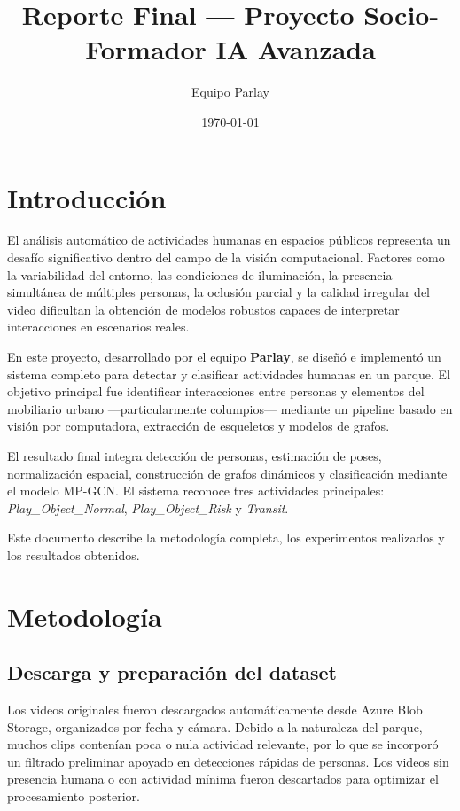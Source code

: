 \documentclass{article}
\title{Reporte Final — Proyecto Socio-Formador IA Avanzada}
\author{Equipo Parlay}
\date{\today}
\begin{document}
\maketitle

\section{Introducción}

El análisis automático de actividades humanas en espacios públicos representa un desafío significativo dentro del campo de la visión computacional. Factores como la variabilidad del entorno, las condiciones de iluminación, la presencia simultánea de múltiples personas, la oclusión parcial y la calidad irregular del video dificultan la obtención de modelos robustos capaces de interpretar interacciones en escenarios reales.

En este proyecto, desarrollado por el equipo \textbf{Parlay}, se diseñó e implementó un sistema completo para detectar y clasificar actividades humanas en un parque. El objetivo principal fue identificar interacciones entre personas y elementos del mobiliario urbano —particularmente columpios— mediante un pipeline basado en visión por computadora, extracción de esqueletos y modelos de grafos.

El resultado final integra detección de personas, estimación de poses, normalización espacial, construcción de grafos dinámicos y clasificación mediante el modelo MP-GCN. El sistema reconoce tres actividades principales: \emph{Play\_Object\_Normal}, \emph{Play\_Object\_Risk} y \emph{Transit}. 

Este documento describe la metodología completa, los experimentos realizados y los resultados obtenidos.

\section{Metodología}

\subsection{Descarga y preparación del dataset}

Los videos originales fueron descargados automáticamente desde Azure Blob Storage, organizados por fecha y cámara. Debido a la naturaleza del parque, muchos clips contenían poca o nula actividad relevante, por lo que se incorporó un filtrado preliminar apoyado en detecciones rápidas de personas. Los videos sin presencia humana o con actividad mínima fueron descartados para optimizar el procesamiento posterior.
\end{document}
